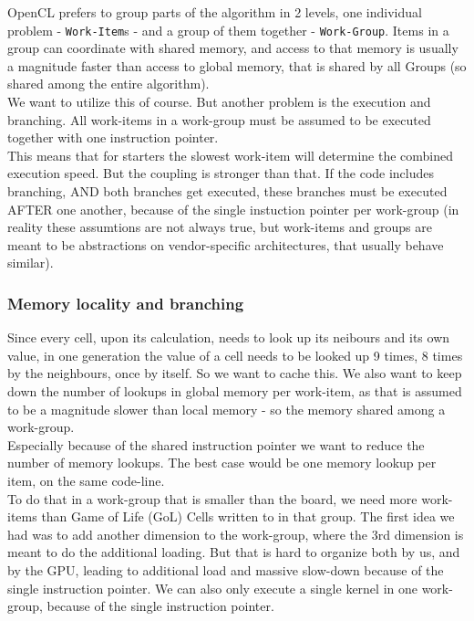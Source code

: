 \documentclass[a4paper,english,12pt,twoside=false]{scrartcl} %
\begin{document}
OpenCL prefers to group parts of the algorithm in 2 levels, one individual problem - \verb|Work-Item|s - 
and a group of them together - \verb|Work-Group|. Items in a group can coordinate with shared memory, 
and access to that memory is usually a magnitude faster than access to global memory, 
that is shared by all Groups (so shared among the entire algorithm).\\
We want to utilize this of course. But another problem is the execution and branching. 
All work-items in a work-group must be assumed to be executed together with one instruction pointer.\\
This means that for starters the slowest work-item will determine the combined execution speed. 
But the coupling is stronger than that. If the code includes branching, AND both branches get executed,
these branches must be executed AFTER one another, because of the single instuction pointer per work-group 
(in reality these assumtions are not always true, but work-items and groups are meant to be abstractions on 
vendor-specific architectures, that usually behave similar).

\subsubsection{Memory locality and branching}

Since every cell, upon its calculation, needs to look up its neibours and its own value, in one generation the value of 
a cell needs to be looked up 9 times, 8 times by the neighbours, once by itself. So we want to cache this.
We also want to keep down the number of lookups in global memory per work-item, as that is assumed to be a magnitude slower 
than local memory - so the memory shared among a work-group.\\
Especially because of the shared instruction pointer we want to reduce the number of memory lookups.
The best case would be one memory lookup per item, on the same code-line.\\
To do that in a work-group that is smaller than the board, we need more work-items than Game of Life (GoL) Cells written to in that group.
The first idea we had was to add another dimension to the work-group, where the 3rd dimension is meant to do the additional loading. 
But that is hard to organize both by us, and by the GPU, leading to additional load and massive slow-down because of the single instruction pointer.
We can also only execute a single kernel in one work-group, because of the single instruction pointer.
\end{document}
